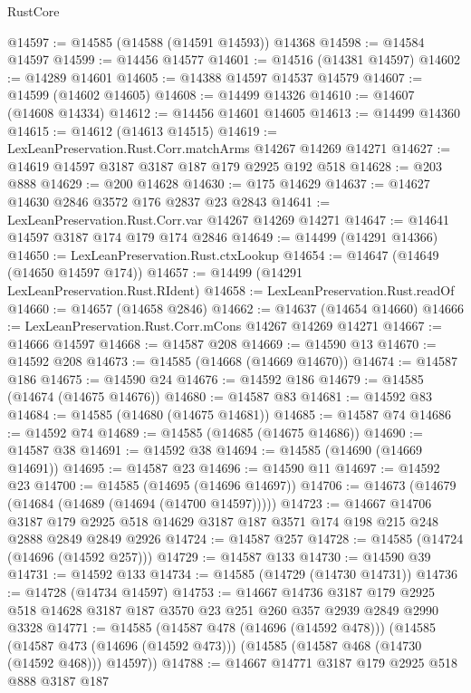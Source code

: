 \begin{lexlean}{RustCore}
\begin{coremodule}
@14597 := @14585 (@14588 (@14591 @14593)) @14368
@14598 := @14584 @14597
@14599 := @14456 @14577
@14601 := @14516 (@14381 @14597)
@14602 := @14289 @14601
@14605 := @14388 @14597 @14537 @14579
@14607 := @14599 (@14602 @14605)
@14608 := @14499 @14326
@14610 := @14607 (@14608 @14334)
@14612 := @14456 @14601 @14605
@14613 := @14499 @14360
@14615 := @14612 (@14613 @14515)
@14619 := LexLeanPreservation.Rust.Corr.matchArms @14267 @14269 @14271
@14627 := @14619 @14597 @3187 @3187 @187 @179 @2925 @192 @518
@14628 := @203 @888
@14629 := @200 @14628
@14630 := @175 @14629
@14637 := @14627 @14630 @2846 @3572 @176 @2837 @23 @2843
@14641 := LexLeanPreservation.Rust.Corr.var @14267 @14269 @14271
@14647 := @14641 @14597 @3187 @174 @179 @174 @2846
@14649 := @14499 (@14291 @14366)
@14650 := LexLeanPreservation.Rust.ctxLookup
@14654 := @14647 (@14649 (@14650 @14597 @174))
@14657 := @14499 (@14291 LexLeanPreservation.Rust.RIdent)
@14658 := LexLeanPreservation.Rust.readOf
@14660 := @14657 (@14658 @2846)
@14662 := @14637 (@14654 @14660)
@14666 := LexLeanPreservation.Rust.Corr.mCons @14267 @14269 @14271
@14667 := @14666 @14597
@14668 := @14587 @208
@14669 := @14590 @13
@14670 := @14592 @208
@14673 := @14585 (@14668 (@14669 @14670))
@14674 := @14587 @186
@14675 := @14590 @24
@14676 := @14592 @186
@14679 := @14585 (@14674 (@14675 @14676))
@14680 := @14587 @83
@14681 := @14592 @83
@14684 := @14585 (@14680 (@14675 @14681))
@14685 := @14587 @74
@14686 := @14592 @74
@14689 := @14585 (@14685 (@14675 @14686))
@14690 := @14587 @38
@14691 := @14592 @38
@14694 := @14585 (@14690 (@14669 @14691))
@14695 := @14587 @23
@14696 := @14590 @11
@14697 := @14592 @23
@14700 := @14585 (@14695 (@14696 @14697))
@14706 := @14673 (@14679 (@14684 (@14689 (@14694 (@14700 @14597)))))
@14723 := @14667
    @14706
    @3187
    @179
    @2925
    @518
    @14629
    @3187
    @187
    @3571
    @174
    @198
    @215
    @248
    @2888
    @2849
    @2849
    @2926
@14724 := @14587 @257
@14728 := @14585 (@14724 (@14696 (@14592 @257)))
@14729 := @14587 @133
@14730 := @14590 @39
@14731 := @14592 @133
@14734 := @14585 (@14729 (@14730 @14731))
@14736 := @14728 (@14734 @14597)
@14753 := @14667
    @14736
    @3187
    @179
    @2925
    @518
    @14628
    @3187
    @187
    @3570
    @23
    @251
    @260
    @357
    @2939
    @2849
    @2990
    @3328
@14771 := @14585
    (@14587 @478 (@14696 (@14592 @478)))
    (@14585
      (@14587 @473 (@14696 (@14592 @473)))
      (@14585 (@14587 @468 (@14730 (@14592 @468))) @14597))
@14788 := @14667
    @14771
    @3187
    @179
    @2925
    @518
    @888
    @3187
    @187

\end{coremodule}
\end{lexlean}
